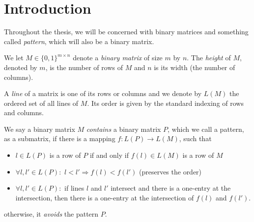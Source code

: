 \chapter*{Introduction}
Throughout the thesis, we will be concerned with binary matrices and something called \emph{pattern}, which will also be a binary matrix.
\begin{defn}
We let $M\in\{0,1\}^{m\times n}$ denote a \emph{binary matrix} of size $m$ by $n$. The \emph{height} of $M$, denoted by $m$, is the number of rows of $M$ and $n$ is its width (the number of columns).
\end{defn}
\begin{defn}
A \emph{line} of a matrix is one of its rows or columns and we denote by $L(M)$ the ordered set of all lines of $M$. Its order is given by the standard indexing of rows and columns.
\end{defn}
\begin{defn}
We say a binary matrix $M$ \emph{contains} a binary matrix $P$, which we call a pattern, as a submatrix, if there is a mapping $f:L(P)\rightarrow L(M)$, such that
\begin{itemize}
\item $l\in L(P)$ is a row of $P$ if and only if $f(l)\in L(M)$ is a row of $M$
\item $\forall l,l'\in L(P):$ $l<l'\Rightarrow f(l)<f(l')$ (preserves the order)
\item $\forall l,l'\in L(P):$ if lines $l$ and $l'$ intersect and there is a one-entry at the intersection, then there is a one-entry at the intersection of $f(l)$ and $f(l')$.
\end{itemize}
otherwise, it \emph{avoids} the pattern $P$.
\end{defn}
